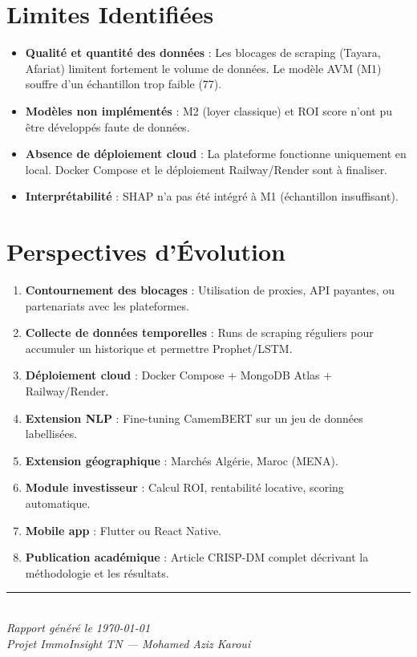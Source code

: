 \documentclass[12pt,a4paper]{report}
\begin{document}
\section{Limites Identifiées}

\begin{itemize}
    \item \textbf{Qualité et quantité des données} : Les blocages de scraping (Tayara, Afariat) limitent fortement le volume de données. Le modèle AVM (M1) souffre d'un échantillon trop faible (77).
    \item \textbf{Modèles non implémentés} : M2 (loyer classique) et ROI score n'ont pu être développés faute de données.
    \item \textbf{Absence de déploiement cloud} : La plateforme fonctionne uniquement en local. Docker Compose et le déploiement Railway/Render sont à finaliser.
    \item \textbf{Interprétabilité} : SHAP n'a pas été intégré à M1 (échantillon insuffisant).
\end{itemize}

\section{Perspectives d'Évolution}

\begin{enumerate}
    \item \textbf{Contournement des blocages} : Utilisation de proxies, API payantes, ou partenariats avec les plateformes.
    \item \textbf{Collecte de données temporelles} : Runs de scraping réguliers pour accumuler un historique et permettre Prophet/LSTM.
    \item \textbf{Déploiement cloud} : Docker Compose + MongoDB Atlas + Railway/Render.
    \item \textbf{Extension NLP} : Fine-tuning CamemBERT sur un jeu de données labellisées.
    \item \textbf{Extension géographique} : Marchés Algérie, Maroc (MENA).
    \item \textbf{Module investisseur} : Calcul ROI, rentabilité locative, scoring automatique.
    \item \textbf{Mobile app} : Flutter ou React Native.
    \item \textbf{Publication académique} : Article CRISP-DM complet décrivant la méthodologie et les résultats.
\end{enumerate}

\vspace{2cm}
\begin{center}
\rule{0.5\textwidth}{0.5pt}\\
\textit{Rapport généré le \today}\\
\textit{Projet ImmoInsight TN — Mohamed Aziz Karoui}
\end{center}
\end{document}
